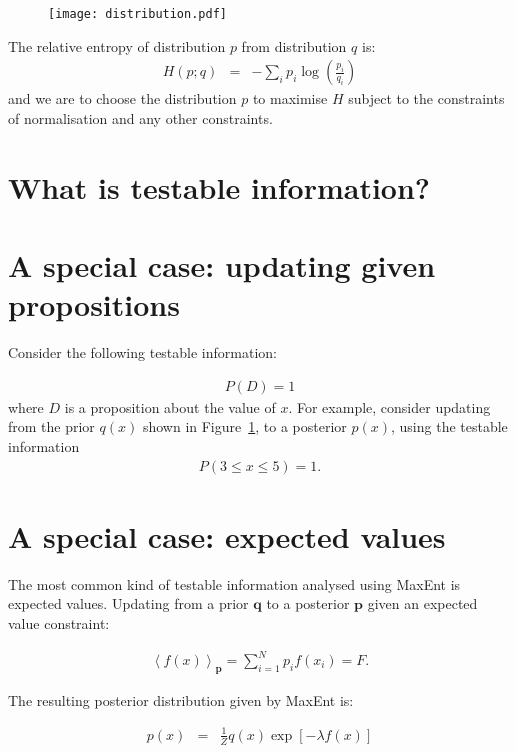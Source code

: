 \documentclass[letterpaper, 11pt]{article}
\begin{document}
\begin{figure}
\begin{center}
\texttt{[image: distribution.pdf]}
\caption{\label{fig:distribution}}
\end{center}
\end{figure}

The relative entropy of distribution $p$ from distribution $q$ is:
\begin{eqnarray}
H(p; q) &=& -\sum_i p_i \log\left(\frac{p_i}{q_i}\right) 
\end{eqnarray}
and we are to choose the distribution $p$ to maximise $H$ subject to the
constraints of normalisation and any other constraints.

\section{What is testable information?}


\section{A special case: updating given propositions}
Consider the following testable information:

\begin{eqnarray}
P(D) = 1
\end{eqnarray}
where $D$ is a proposition about the value of $x$. For example, consider
updating from the prior $q(x)$ shown in Figure~\ref{fig:distribution}, to
a posterior $p(x)$, using the testable information
\begin{eqnarray}
P(3 \leq x \leq 5) = 1.
\end{eqnarray}


\section{A special case: expected values}\label{sec:expectations}
The most common kind of testable information analysed using MaxEnt is
expected values. Updating from a prior $\boldsymbol{q}$ to a posterior
$\boldsymbol{p}$ given an expected value constraint:

\begin{eqnarray}
\left<f(x)\right>_{\boldsymbol{p}} = \sum_{i=1}^N p_i f(x_i) = F.
\end{eqnarray}

The resulting posterior distribution given by MaxEnt is:

\begin{eqnarray}
p(x) &=& \frac{1}{Z}q(x)\exp\left[-\lambda f(x)\right] 
\end{eqnarray}
\end{document}
